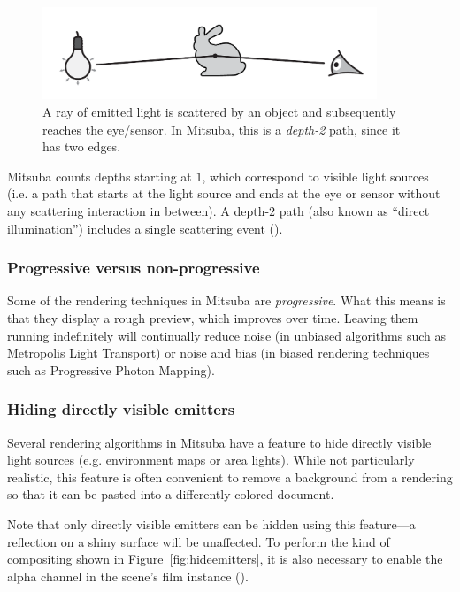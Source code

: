 \begin{figure}[h!]
\centering
\vspace{-5mm}
\includegraphics[width=10cm]{images/path_explanation.pdf}
\vspace{-5mm}
\caption{
    \label{fig:path-explanation}
    A ray of emitted light is scattered by an object and subsequently
    reaches the eye/sensor.
    In Mitsuba, this is a \emph{depth-2} path, since it has two edges.
}
\end{figure}
Mitsuba counts depths starting at $1$, which correspond to
visible light sources (i.e. a path that starts at the light
source and ends at the eye or sensor without any scattering
interaction in between).
A depth-$2$ path (also known as ``direct illumination'') includes
a single scattering event ().

\subsubsection*{Progressive versus non-progressive}
Some of the rendering techniques in Mitsuba are \emph{progressive}.
What this means is that they display a rough preview, which improves over time.
Leaving them running indefinitely will continually reduce noise (in unbiased algorithms
such as Metropolis Light Transport) or noise and bias (in biased
rendering techniques such as Progressive Photon Mapping).
\newpage
\subsubsection*{Hiding directly visible emitters}
\label{sec:hideemitters}
Several rendering algorithms in Mitsuba have a feature to hide directly
visible light sources (e.g. environment maps or area lights). While not
particularly realistic, this feature is often convenient to remove a background
from a rendering so that it can be pasted into a differently-colored document.

Note that only directly visible emitters can be hidden using this feature---a
reflection on a shiny surface will be unaffected. To perform the kind of
compositing shown in Figure~\ref{fig:hideemitters}, it is also necessary to
enable the alpha channel in the scene's film instance ().

